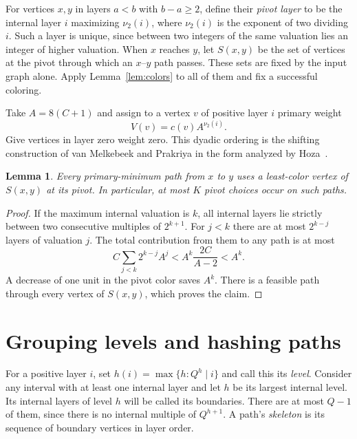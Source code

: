 \documentclass[11pt]{article}
\newtheorem{lemma}[theorem]{Lemma}
\begin{document}
For vertices $x,y$ in layers $a<b$ with $b-a\ge2$, define their \emph{pivot layer} to be the internal layer $i$ maximizing $\nu_2(i)$, where $\nu_2(i)$ is the exponent of two dividing $i$. Such a layer is unique, since between two integers of the same valuation lies an integer of higher valuation. When $x$ reaches $y$, let $S(x,y)$ be the set of vertices at the pivot through which an $x$--$y$ path passes. These sets are fixed by the input graph alone. Apply Lemma~\ref{lem:colors} to all of them and fix a successful coloring.

Take $A=8(C+1)$ and assign to a vertex $v$ of positive layer $i$ primary weight
\[
                       V(v)=c(v)A^{\nu_2(i)} .
\]
Give vertices in layer zero weight zero. This dyadic ordering is the shifting construction of van Melkebeek and Prakriya in the form analyzed by Hoza~\cite[Appendix A]{Hoza}.

\begin{lemma}\label{lem:mid}
Every primary-minimum path from $x$ to $y$ uses a least-color vertex of $S(x,y)$ at its pivot. In particular, at most $K$ pivot choices occur on such paths.
\end{lemma}
\begin{proof}
If the maximum internal valuation is $k$, all internal layers lie strictly between two consecutive multiples of $2^{k+1}$. For $j<k$ there are at most $2^{k-j}$ layers of valuation $j$. The total contribution from them to any path is at most
\[
 C\sum_{j<k}2^{k-j}A^j
 < A^k \frac{2C}{A-2} < A^k .
\]
A decrease of one unit in the pivot color saves $A^k$. There is a feasible path through every vertex of $S(x,y)$, which proves the claim.
\end{proof}

\section{Grouping levels and hashing paths}

For a positive layer $i$, set $h(i)=\max\{h:Q^h\mid i\}$ and call this its \emph{level}. Consider any interval with at least one internal layer and let $h$ be its largest internal level. Its internal layers of level $h$ will be called its boundaries. There are at most $Q-1$ of them, since there is no internal multiple of $Q^{h+1}$. A path's \emph{skeleton} is its sequence of boundary vertices in layer order.
\end{document}
